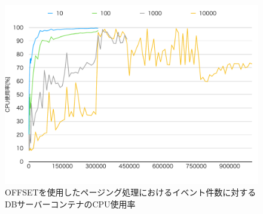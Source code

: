 \documentclass[../../../../../main]{subfiles}
\begin{document}
    \begin{figure}[H]
        \centering
        \includegraphics[width=12cm]{graph}
        \caption{OFFSETを使用したページング処理におけるイベント件数に対するDBサーバーコンテナのCPU使用率}
        \label{fig:paging-offset-db-cpu-app_1_1024-db_1_1024}
    \end{figure}
\end{document}
